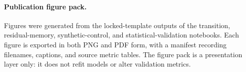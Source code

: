 \paragraph{Publication figure pack.}
Figures were generated from the locked-template outputs of the transition, residual-memory, synthetic-control, and statistical-validation notebooks. Each figure is exported in both PNG and PDF form, with a manifest recording filenames, captions, and source metric tables. The figure pack is a presentation layer only: it does not refit models or alter validation metrics.

